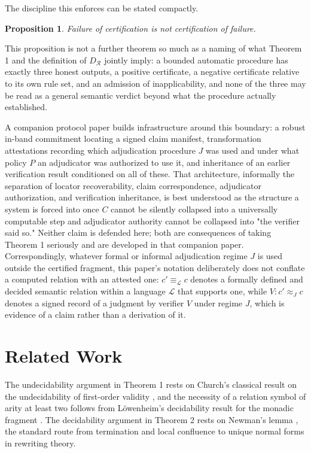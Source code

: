 \documentclass[11pt]{article}
\newtheorem{proposition}{Proposition}
\begin{document}
The discipline this enforces can be stated compactly.

\begin{proposition}
Failure of certification is not certification of failure.
\end{proposition}

This proposition is not a further theorem so much as a naming of what Theorem 1 and the definition of $D_{\mathcal{R}}$ jointly imply: a bounded automatic procedure has exactly three honest outputs, a positive certificate, a negative certificate relative to its own rule set, and an admission of inapplicability, and none of the three may be read as a general semantic verdict beyond what the procedure actually established.

A companion protocol paper builds infrastructure around this boundary: a robust in-band commitment locating a signed claim manifest, transformation attestations recording which adjudication procedure $J$ was used and under what policy $P$ an adjudicator was authorized to use it, and inheritance of an earlier verification result conditioned on all of these. That architecture, informally the separation of locator recoverability, claim correspondence, adjudicator authorization, and verification inheritance, is best understood as the structure a system is forced into once $C$ cannot be silently collapsed into a universally computable step and adjudicator authority cannot be collapsed into "the verifier said so." Neither claim is defended here; both are consequences of taking Theorem 1 seriously and are developed in that companion paper. Correspondingly, whatever formal or informal adjudication regime $J$ is used outside the certified fragment, this paper's notation deliberately does not conflate a computed relation with an attested one: $c' \equiv_{\mathcal{L}} c$ denotes a formally defined and decided semantic relation within a language $\mathcal{L}$ that supports one, while $V : c' \approx_J c$ denotes a signed record of a judgment by verifier $V$ under regime $J$, which is evidence of a claim rather than a derivation of it.

\section{Related Work}

The undecidability argument in Theorem 1 rests on Church's classical result on the undecidability of first-order validity \cite{church1936}, and the necessity of a relation symbol of arity at least two follows from Löwenheim's decidability result for the monadic fragment \cite{lowenheim1915}. The decidability argument in Theorem 2 rests on Newman's lemma \cite{newman1942}, the standard route from termination and local confluence to unique normal forms in rewriting theory.
\end{document}

